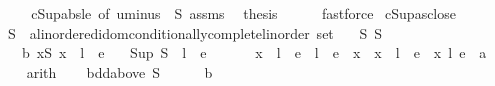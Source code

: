 \begin{isabellebody}
\ \ \isamarkupfalse%
\isanewline
\ \ \isamarkupfalse%
\ cSup{\isacharunderscore}{\kern0pt}abs{\isacharunderscore}{\kern0pt}le\ {\isacharbrackleft}{\kern0pt}of\ {\isachardoublequoteopen}uminus\ {\isacharbackquote}{\kern0pt}\ S{\isachardoublequoteclose}{\isacharbrackright}{\kern0pt}\ assms\ \isamarkupfalse%
\ {\isacharquery}{\kern0pt}thesis\isanewline
\ \ \ \ \isamarkupfalse%
\ fastforce\isanewline
{}\isamarkupfalse%
%
\endisatagproof
{\isafoldproof}%
%
\isadelimproof
\isanewline
%
\endisadelimproof
\isanewline
{}\isamarkupfalse%
\ cSup{\isacharunderscore}{\kern0pt}asclose{\isacharcolon}{\kern0pt}\isanewline
\ \ \ S\ {\isacharcolon}{\kern0pt}{\isacharcolon}{\kern0pt}\ {\isachardoublequoteopen}{\isacharprime}{\kern0pt}a{\isacharcolon}{\kern0pt}{\isacharcolon}{\kern0pt}{\isacharbraceleft}{\kern0pt}linordered{\isacharunderscore}{\kern0pt}idom{\isacharcomma}{\kern0pt}conditionally{\isacharunderscore}{\kern0pt}complete{\isacharunderscore}{\kern0pt}linorder{\isacharbraceright}{\kern0pt}\ set{\isachardoublequoteclose}\isanewline
\ \ \ S{\isacharcolon}{\kern0pt}\ {\isachardoublequoteopen}S\ {\isasymnoteq}\ {\isacharbraceleft}{\kern0pt}{\isacharbraceright}{\kern0pt}{\isachardoublequoteclose}\isanewline
\ \ \ \ \ b{\isacharcolon}{\kern0pt}\ {\isachardoublequoteopen}{\isasymforall}x{\isasymin}S{\isachardot}{\kern0pt}\ {\isasymbar}x\ {\isacharminus}{\kern0pt}\ l{\isasymbar}\ {\isasymle}\ e{\isachardoublequoteclose}\isanewline
\ \ \ {\isachardoublequoteopen}{\isasymbar}Sup\ S\ {\isacharminus}{\kern0pt}\ l{\isasymbar}\ {\isasymle}\ e{\isachardoublequoteclose}\isanewline
%
\isadelimproof
%
\endisadelimproof
%
\isatagproof
{}\isamarkupfalse%
\ {\isacharminus}{\kern0pt}\isanewline
\ \ \isamarkupfalse%
\ {\isacharasterisk}{\kern0pt}{\isacharcolon}{\kern0pt}\ {\isachardoublequoteopen}{\isasymbar}x\ {\isacharminus}{\kern0pt}\ l{\isasymbar}\ {\isasymle}\ e\ {\isasymlongleftrightarrow}\ l\ {\isacharminus}{\kern0pt}\ e\ {\isasymle}\ x\ {\isasymand}\ x\ {\isasymle}\ l\ {\isacharplus}{\kern0pt}\ e{\isachardoublequoteclose}\ \ x\ l\ e\ {\isacharcolon}{\kern0pt}{\isacharcolon}{\kern0pt}\ {\isacharprime}{\kern0pt}a\isanewline
\ \ \ \ \isamarkupfalse%
\ arith\isanewline
\ \ \isamarkupfalse%
\ {\isachardoublequoteopen}bdd{\isacharunderscore}{\kern0pt}above\ S{\isachardoublequoteclose}\isanewline
\ \ \ \ \isamarkupfalse%
\ b\ \isamarkupfalse%

\end{isabellebody}
